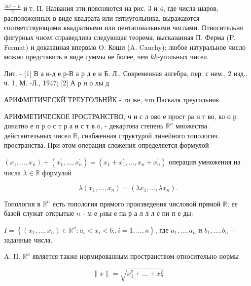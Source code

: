 \documentclass[10pt]{article}
\begin{document}
$\frac{3 n^{2}-n}{2}$ и т. П. Названия эти поясняются на рис. 3 и 4, где числа шаров, расположенных в виде квадрата или пятиугольника, выражаются соответствующими квадратными или пентагональными числами. Относительно фигурных чисел справедлива следующая теорема, высказанная П. Ферма (P. Fermat) и доказанная впервыө O. Коши (A. Cauchy): любое натуральное число можно представить в виде суммы не более, чем $k k$-угольных чисел.



Лит. - [1] В а н-д е р-В а р д е н Б. Л., Современная алгебра, пер. с нем., 2 изд., ч. 1, М. -Л., 1947; [2] А р н о лы д



АРИФМЕТИЧЕСКЙ̆ ТРЕУГОЛЬНЙК - то же, что Паскаля треугольник.



АРИФМЕТИЧЕСКОЕ ІРОСТРАНСТВО, ч и с л ово е прост ра н т во, ко о р динатно е п р о с т р а н с т в о, - декартова степень $\mathbb{R}^{n}$ множества действительных чисел $\mathbb{R}$, снабженная структурой линейного топологич. пространства. При әтом операция сложения определяется формулой



$\left(x_{1}, \ldots, x_{n}\right)+\left(x_{1}^{\prime}, \ldots, x_{n}^{\prime}\right)=\left(x_{1}+x_{1}^{\prime}, \ldots, x_{n}+x_{n}^{\prime}\right)$ операция умножения на числа $\lambda \in \mathbb{R}$ формулой



\[

\lambda\left(x_{1}, \ldots, x_{n}\right)=\left(\lambda x_{1}, \ldots, \lambda x_{n}\right) .

\]



Топология в $\mathbb{R}^{n}$ есть топология прямого произведения числовой прямой $\mathbb{R}$; ее базой служат открытые $n$ - м е pны е па р а л л л е пи п е ды:



$I=\left\{\left(x_{1}, \ldots, x_{n}\right) \in \mathbb{R}^{n}: a_{i}<x_{i}<b_{i}, i=1, \ldots, n\right\}$, где $a_{1}, \ldots, a_{n}$ и $b_{1}, \ldots, b_{n}-$ заданные числа.



A. П. $\mathbb{R}^{n}$ является также нормированным пространством относительно нормы



\[

\|x\|=\sqrt{x_{1}^{2}+\ldots+x_{n}^{2}}

\]
\end{document}
